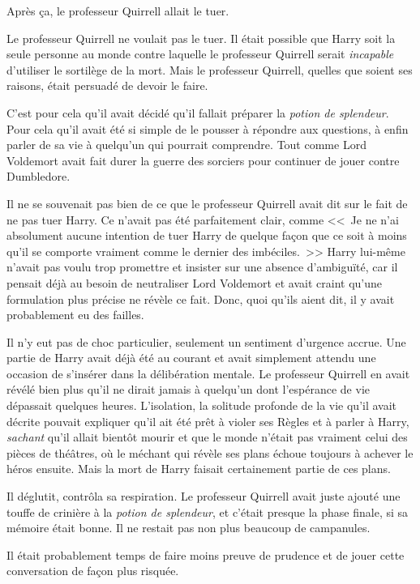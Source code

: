 Après ça, le professeur Quirrell allait le tuer.

Le professeur Quirrell ne voulait pas le tuer. Il était possible que Harry soit la seule personne au monde contre laquelle le professeur Quirrell serait \emph{incapable} d'utiliser le sortilège de la mort. Mais le professeur Quirrell, quelles que soient ses raisons, était persuadé de devoir le faire.

C'est pour cela qu'il avait décidé qu'il fallait préparer la \emph{potion de splendeur}. Pour cela qu'il avait été si simple de le pousser à répondre aux questions, à enfin parler de sa vie à quelqu'un qui pourrait comprendre. Tout comme Lord Voldemort avait fait durer la guerre des sorciers pour continuer de jouer contre Dumbledore.

Il ne se souvenait pas bien de ce que le professeur Quirrell avait dit sur le fait de ne pas tuer Harry. Ce n'avait pas été parfaitement clair, comme <<~Je ne n'ai absolument aucune intention de tuer Harry de quelque façon que ce soit à moins qu'il se comporte vraiment comme le dernier des imbéciles.~>> Harry lui-même n'avait pas voulu trop promettre et insister sur une absence d'ambiguïté, car il pensait déjà au besoin de neutraliser Lord Voldemort et avait craint qu'une formulation plus précise ne révèle ce fait. Donc, quoi qu'ils aient dit, il y avait probablement eu des failles.

Il n'y eut pas de choc particulier, seulement un sentiment d'urgence accrue. Une partie de Harry avait déjà été au courant et avait simplement attendu une occasion de s'insérer dans la délibération mentale. Le professeur Quirrell en avait révélé bien plus qu'il ne dirait jamais à quelqu'un dont l'espérance de vie dépassait quelques heures. L'isolation, la solitude profonde de la vie qu'il avait décrite pouvait expliquer qu'il ait été prêt à violer ses Règles et à parler à Harry, \emph{sachant} qu'il allait bientôt mourir et que le monde n'était pas vraiment celui des pièces de théâtres, où le méchant qui révèle ses plans échoue toujours à achever le héros ensuite. Mais la mort de Harry faisait certainement partie de ces plans.

Il déglutit, contrôla sa respiration. Le professeur Quirrell avait juste ajouté une touffe de crinière à la \emph{potion de splendeur}, et c'était presque la phase finale, si sa mémoire était bonne. Il ne restait pas non plus beaucoup de campanules.

Il était probablement temps de faire moins preuve de prudence et de jouer cette conversation de façon plus risquée.

